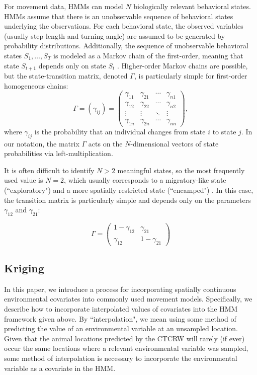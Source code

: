 \documentclass[12pt]{article}
\begin{document}
	For movement data, HMMs can model $N$ biologically relevant behavioral states. HMMs assume that there is an unobservable sequence of behavioral states underlying the observations. For each behavioral state, the observed variables (usually step length and turning angle) are assumed to be generated by probability distributions. Additionally, the sequence of unobservable behavioral states $S_1, \ldots, S_T$ is modeled as a Markov chain of the first-order, meaning that state $S_{t + 1}$ depends only on state $S_t$ \cite{Langrock2012}. Higher-order Markov chains are possible, but the state-transition matrix, denoted $\Gamma$, is particularly simple for first-order homogeneous chains:
	\[\Gamma = (\gamma_{ij}) = \begin{pmatrix} \gamma_{11} & \gamma_{21} & \cdots & \gamma_{n1} \\ \gamma_{12} & \gamma_{22} & \cdots & \gamma_{n2} \\ \vdots & \vdots & \ddots & \vdots \\ \gamma_{1n} & \gamma_{2n} &\cdots & \gamma_{nn} \end{pmatrix},\]
	where $\gamma_{ij}$ is the probability that an individual changes from state $i$ to state $j$. In our notation, the matrix $\Gamma$ acts on the $N$-dimensional vectors of state probabilities via left-multiplication.
	
	It is often difficult to identify $N > 2$ meaningful states, so the most frequently used value is $N = 2$, which usually corresponds to a migratory-like state (``exploratory") and a more spatially restricted state (``encamped") \cite{McClintock2018}. In this case, the transition matrix is particularly simple and depends only on the parameters $\gamma_{12}$ and $\gamma_{21}$:
	
	\[\Gamma = \begin{pmatrix} 1 - \gamma_{12} & \gamma_{21} \\ \gamma_{12} & 1 - \gamma_{21} \end{pmatrix}\]
	
	\subsection{Kriging} \label{sec:kriging}
	
	In this paper, we introduce a process for incorporating spatially continuous environmental covariates into commonly used movement models. Specifically, we describe how to incorporate interpolated values of covariates into the HMM framework given above. By ``interpolation", we mean using some method of predicting the value of an environmental variable at an unsampled location. Given that the animal locations predicted by the CTCRW will rarely (if ever) occur the same locations where a relevant environmental variable was sampled, some method of interpolation is necessary to incorporate the environmental variable as a covariate in the HMM.
	
\end{document}
